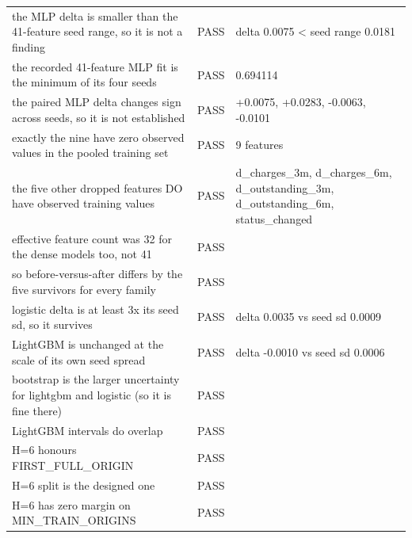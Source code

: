 \begin{table}
\begin{tabular}{lll}
the MLP delta is smaller than the 41-feature seed range, so it is not a finding & PASS & delta 0.0075 < seed range 0.0181 \\
the recorded 41-feature MLP fit is the minimum of its four seeds & PASS & 0.694114 \\
the paired MLP delta changes sign across seeds, so it is not established & PASS & +0.0075, +0.0283, -0.0063, -0.0101 \\
exactly the nine have zero observed values in the pooled training set & PASS & 9 features \\
the five other dropped features DO have observed training values & PASS & d_charges_3m, d_charges_6m, d_outstanding_3m, d_outstanding_6m, status_changed \\
effective feature count was 32 for the dense models too, not 41 & PASS &  \\
so before-versus-after differs by the five survivors for every family & PASS &  \\
logistic delta is at least 3x its seed sd, so it survives & PASS & delta 0.0035 vs seed sd 0.0009 \\
LightGBM is unchanged at the scale of its own seed spread & PASS & delta -0.0010 vs seed sd 0.0006 \\
bootstrap is the larger uncertainty for lightgbm and logistic (so it is fine there) & PASS &  \\
LightGBM intervals do overlap & PASS &  \\
H=6 honours FIRST_FULL_ORIGIN & PASS &  \\
H=6 split is the designed one & PASS &  \\
H=6 has zero margin on MIN_TRAIN_ORIGINS & PASS &  \\
\bottomrule
\end{tabular}
\end{table}

